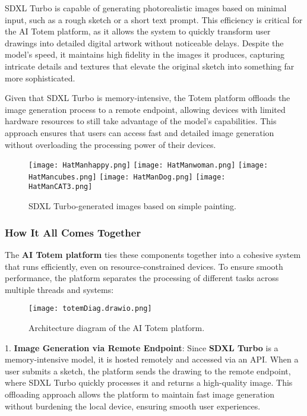 SDXL Turbo is capable of generating photorealistic images based on minimal input, such as a rough sketch or a short text prompt.
This efficiency is critical for the AI Totem platform, as it allows the system to quickly transform user drawings into detailed digital artwork without noticeable delays.
Despite the model's speed, it maintains high fidelity in the images it produces, capturing intricate details and textures that elevate the original sketch into something far more sophisticated.

Given that SDXL Turbo is memory-intensive, the Totem platform offloads the image generation process to a remote endpoint, allowing devices with limited hardware resources to still take advantage of the model's capabilities.
This approach ensures that users can access fast and detailed image generation without overloading the processing power of their devices.

\begin{figure}[h!]
    \centering
    \texttt{[image: HatManhappy.png]}
    \texttt{[image: HatManwoman.png]}
    \texttt{[image: HatMancubes.png]}
    \texttt{[image: HatManDog.png]}
    \texttt{[image: HatManCAT3.png]}
    \caption{SDXL Turbo-generated images based on simple painting.}
    \vspace{0.1cm}
    \label{fig:sdxlpainting}
\end{figure}

\floatbarrier

\subsubsection{ How It All Comes Together}


The \textbf{AI Totem platform} ties these components together into a cohesive system that runs efficiently, even on resource-constrained devices.
To ensure smooth performance, the platform separates the processing of different tasks across multiple threads and systems:

\begin{figure}[h!]
    \centering
    \texttt{[image: totemDiag.drawio.png]}
    \caption{Architecture diagram of the AI Totem platform.}
    \vspace{0.1cm}
    \label{fig:diagtotem}
\end{figure}

1.  \textbf{Image Generation via Remote Endpoint}: Since \textbf{SDXL Turbo} is a memory-intensive model, it is hosted remotely and accessed via an API.
When a user submits a sketch, the platform sends the drawing to the remote endpoint, where SDXL Turbo quickly processes it and returns a high-quality image.
This offloading approach allows the platform to maintain fast image generation without burdening the local device, ensuring smooth user experiences.
    
